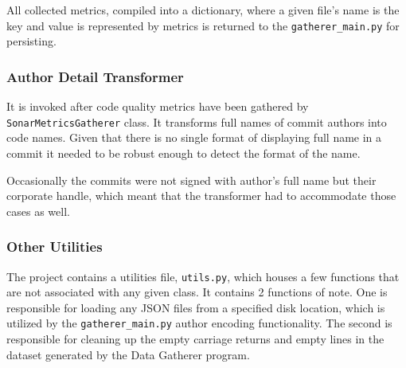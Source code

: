 All collected metrics, compiled into a dictionary, where a given file's name is the key and value is represented by metrics is returned to the \texttt{gatherer\_main.py} for persisting.

\subsubsection{Author Detail Transformer}\label{sec:source-code:author-encoder}
It is invoked after code quality metrics have been gathered by \texttt{SonarMetricsGatherer} class. It transforms full names of commit authors into code names. Given that there is no single format of displaying full name in a commit it needed to be robust enough to detect the format of the name. 

Occasionally the commits were not signed with author's full name but their corporate handle, which meant that the transformer had to accommodate those cases as well.

\subsubsection{Other Utilities}
The project contains a utilities file, \texttt{utils.py}, which houses a few functions that are not associated with any given class. It contains 2 functions of note. One is responsible for loading any JSON files from a specified disk location, which is utilized by the \texttt{gatherer\_main.py} author encoding functionality. The second is responsible for cleaning up the empty carriage returns and empty lines in the dataset generated by the Data Gatherer program. 

